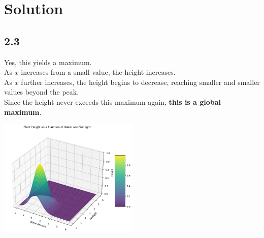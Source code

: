 \documentclass{../harvardml}
\theoremstyle{definition}
\theoremstyle{plain}
\newenvironment{solution}
  {\color{blue}\section*{Solution}}
{}
\begin{document}
\begin{solution}
\subsection*{2.3}
Yes, this yields a maximum. \\

As \( x \) increases from a small value, the height increases. \\

As \( x \) further increases, the height begins to decrease, reaching smaller and smaller values beyond the peak. \\

Since the height never exceeds this maximum again, \textbf{this is a global maximum}.

\end{solution}


\begin{center}
    \includegraphics[width=0.5\textwidth]{images/2.3.png}
    \end{center}

\newpage 
\end{document}
